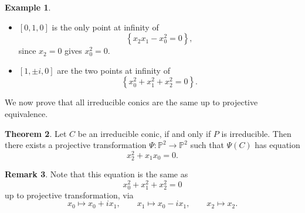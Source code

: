 \documentclass{article}
\renewcommand{\P}{\mathbb{P}}
\newcommand{\rb}[1]{\left( #1 \right)}
\renewcommand{\sb}[1]{\left[ #1 \right]}
\newcommand{\cb}[1]{\left\{ #1 \right\}}
\theoremstyle{definition}\newtheorem{definition}{Definition}[section]
\theoremstyle{definition}\newtheorem{notation}[definition]{Notation}
\theoremstyle{definition}\newtheorem{remark}[definition]{Remark}
\theoremstyle{definition}\newtheorem{example1}[definition]{Example}
\theoremstyle{definition}\newtheorem{fact}{Fact}
\theoremstyle{definition}\newtheorem{exercise}{Exercise}
\theoremstyle{definition}\newtheorem*{example2}{Example}
\newtheorem{theorem}[definition]{Theorem}
\begin{document}
\begin{example1}
\hfill
\begin{itemize}
\item $ \sb{0, 1, 0} $ is the only point at infinity of
$$ \cb{x_2x_1 - x_0^2 = 0}, $$
since $ x_2 = 0 $ gives $ x_0^2 = 0 $.
\item $ \sb{1, \pm i, 0} $ are the two points at infinity of
$$ \cb{x_0^2 + x_1^2 + x_2^2 = 0}. $$
\end{itemize}
\end{example1}

We now prove that all irreducible conics are the same up to projective equivalence.

\begin{theorem}
\label{thm:10.2}
Let $ C $ be an irreducible conic, if and only if $ P $ is irreducible. Then there exists a projective transformation $ \Psi : \P^2 \to \P^2 $ such that $ \Psi\rb{C} $ has equation
$$ x_2^2 + x_1x_0 = 0. $$
\end{theorem}

\begin{remark}
Note that this equation is the same as
$$ x_0^2 + x_1^2 + x_2^2 = 0 $$
up to projective transformation, via
$$ x_0 \mapsto x_0 + ix_1, \qquad x_1 \mapsto x_0 - ix_1, \qquad x_2 \mapsto x_2. $$
\end{remark}
\end{document}
